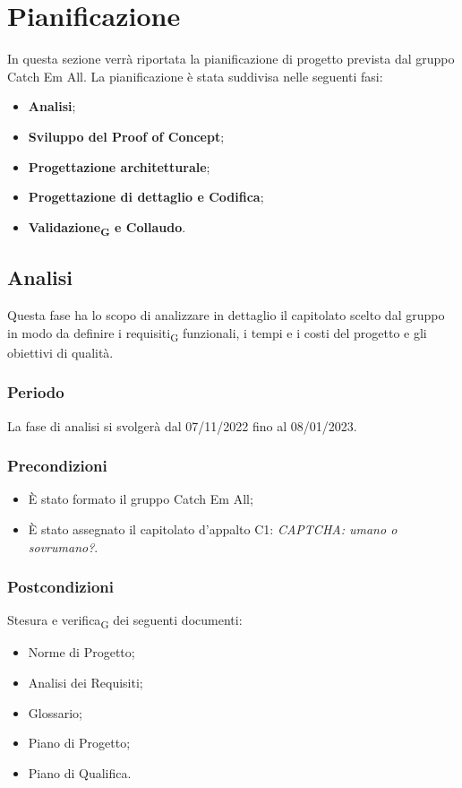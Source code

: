 \section{Pianificazione}
In questa sezione verrà riportata la pianificazione di progetto prevista dal gruppo Catch Em All. La pianificazione è stata suddivisa nelle seguenti fasi:
\begin{itemize}
	\item \textbf{Analisi};
	\item \textbf{Sviluppo del Proof of Concept};
	\item \textbf{Progettazione architetturale};
    \item \textbf{Progettazione di dettaglio e Codifica};
	\item \textbf{Validazione\textsubscript{G} e Collaudo}.
\end{itemize}

\subsection{Analisi}
Questa fase ha lo scopo di analizzare in dettaglio il capitolato scelto dal gruppo in modo da definire i requisiti\textsubscript{G} funzionali, i tempi e i costi del progetto e gli obiettivi di qualità.

\subsubsection{Periodo}
La fase di analisi si svolgerà dal 07/11/2022 fino al 08/01/2023.

\subsubsection{Precondizioni}\:
\begin{itemize}
	\item È stato formato il gruppo Catch Em All;
	\item È stato assegnato il capitolato d’appalto C1: \textit{\textit{CA}PTCHA: umano o sovrumano?}.
\end{itemize}

\subsubsection{Postcondizioni}
Stesura e verifica\textsubscript{G} dei seguenti documenti:
\begin{itemize}
	\item Norme di Progetto;
	\item Analisi dei Requisiti;
	\item Glossario;
    \item Piano di Progetto;
	\item Piano di Qualifica.
\end{itemize}

